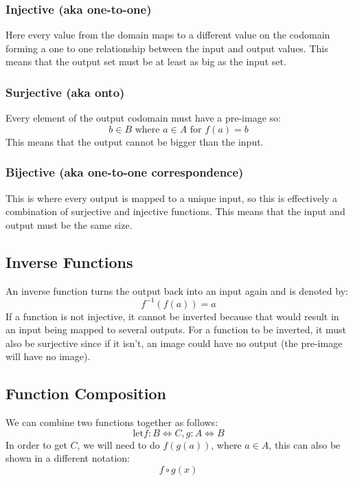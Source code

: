 \subsubsection{Injective (aka one-to-one)}\label{ssub:injective_aka_one_to_one_}

Here every value from the domain maps to a different value on the codomain forming a one to one relationship between the input and output values.
This means that the output set must be at least as big as the input set.

\subsubsection{Surjective (aka onto)}\label{ssub:surjective_aka_onto_}

Every element of the output codomain must have a pre-image so:
\[
    b\in B \text{ where } a \in A \text{ for } f(a)=b
\]
This means that the output cannot be bigger than the input.

\subsubsection{Bijective (aka one-to-one correspondence)}\label{ssub:bijective_aka_one_to_one_correspondence_}

This is where every output is mapped to a unique input, so this is effectively a combination of surjective and injective functions.
This means that the input and output must be the same size.

\subsection{Inverse Functions}\label{sub:inverse_functions}

An inverse function turns the output back into an input again and is denoted by:
\[
    f^{-1}(f(a))=a
\]
If a function is not injective, it cannot be inverted because that would result in an input being mapped to several outputs.
For a function to be inverted, it must also be surjective since if it isn't, an image could have no output (the pre-image will have no image).

\subsection{Function Composition}\label{sub:function_composition}

We can combine two functions together as follows:
\[
    \text{let} f: B \iff C, g: A \iff B
\]
In order to get \(C\), we will need to do \(f(g(a))\), where \(a \in A\), this can also be shown in a different notation:
\[
    f \circ g(x)
\]
